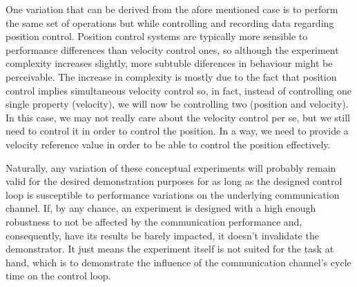 One variation that can be derived from the afore mentioned case is to perform the same set of operations but while controlling and recording data regarding position control.
Position control systems are typically more sensible to performance differences than velocity control ones, so although the experiment complexity increases slightly, more subtuble diferences in behaviour might be perceivable.
The increase in complexity is mostly due to the fact that position control implies simultaneous velocity control so, in fact, instead of controlling one single property (velocity), we will now be controlling two (position and velocity).
In this case, we may not really care about the velocity control per se, but we still need to control it in order to control the position.
In a way, we need to provide a velocity reference value in order to be able to control the position effectively.

Naturally, any variation of these conceptual experiments will probably remain valid for the desired demonstration purposes for as long as the designed control loop is susceptible to performance variations on the underlying communication channel.
If, by any chance, an experiment is designed with a high enough robustness to not be affected by the communication performance and, consequently, have its results be barely impacted, it doesn't invalidate the demonstrator.
It just means the experiment itself is not suited for the task at hand, which is to demonstrate the influence of the communication channel's cycle time on the control loop.

